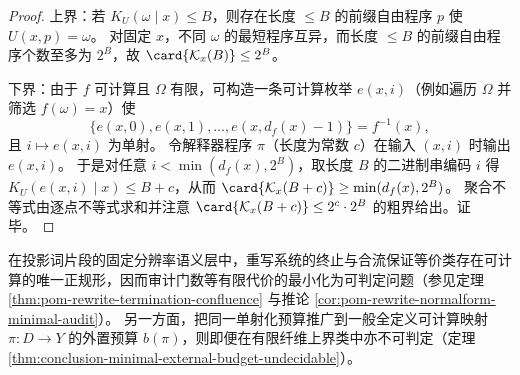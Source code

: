 \begin{proof}
上界：若 \(K_U(\omega\mid x)\le B\)，则存在长度 \(\le B\) 的前缀自由程序 \(p\) 使 \(U(x,p)=\omega\)。
对固定 \(x\)，不同 \(\omega\) 的最短程序互异，而长度 \(\le B\) 的前缀自由程序个数至多为 \(2^B\)，故 \(\card{\mathcal K_x(B)}\le 2^B\)。
\par
下界：由于 \(f\) 可计算且 \(\Omega\) 有限，可构造一条可计算枚举 \(e(x,i)\)（例如遍历 \(\Omega\) 并筛选 \(f(\omega)=x\)）使
\[
\{e(x,0),e(x,1),\dots,e(x,d_f(x)-1)\}=f^{-1}(x),
\]
且 \(i\mapsto e(x,i)\) 为单射。
令解释器程序 \(\pi\)（长度为常数 \(c\)）在输入 \((x,i)\) 时输出 \(e(x,i)\)。
于是对任意 \(i<\min(d_f(x),2^B)\)，取长度 \(B\) 的二进制串编码 \(i\) 得 \(K_U(e(x,i)\mid x)\le B+c\)，从而
\(\card{\mathcal K_x(B+c)}\ge \min(d_f(x),2^B)\)。
聚合不等式由逐点不等式求和并注意 \(\card{\mathcal K_x(B+c)}\le 2^c\cdot 2^B\) 的粗界给出。证毕。
\end{proof}

\begin{corollary}[有限语义层的正规形最小化与图灵层预算最小化的分界]\label{cor:pom-normalform-vs-turing-budget-undecidable}
在投影词片段的固定分辨率语义层中，重写系统的终止与合流保证等价类存在可计算的唯一正规形，因而审计门数等有限代价的最小化为可判定问题（参见定理 \ref{thm:pom-rewrite-termination-confluence} 与推论 \ref{cor:pom-rewrite-normalform-minimal-audit}）。
另一方面，把同一单射化预算推广到一般全定义可计算映射 \(\pi:D\to Y\) 的外置预算 \(b(\pi)\)，则即便在有限纤维上界类中亦不可判定（定理 \ref{thm:conclusion-minimal-external-budget-undecidable}）。
\end{corollary}

